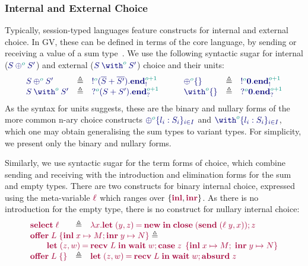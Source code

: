 \documentclass[main.tex]{subfiles}
\begin{document}
\subsubsection*{Internal and External Choice}
Typically, session-typed languages feature constructs for internal and external choice. In GV, these can be defined in terms of the core language, by sending or receiving a value of a sum type~\cite{lindleymorris15}. We use the following syntactic sugar for internal ($\ty{\tyselect[\cs{o}]{S}{S'}}$) and external ($\ty{\tyoffer[\cs{o}]{S}{S'}}$) choice and their units:
\[
\begin{array}{lcl}
  \ty{\tyselect[\cs{o}]{S}{S'}}
  & \elabarrow & \ty{\tysend[\cs{o}]{(\tysum{\co{S}}{\co{S'}})}{\tyends[\cs{o+1}]}} \\
  \ty{\tyoffer[\cs{o}]{S}{S'}}
  & \elabarrow & \ty{\tyrecv[\cs{o}]{(\tysum{S}{S'})}{\tyendr[\cs{o+1}]}} \\
\end{array}
\qquad
\begin{array}{lcl}
  \ty{\tyselectemp[\cs{o}]}
  & \elabarrow & \ty{\tysend[\cs{o}]{\tyvoid}{\tyends[\cs{o+1}]}} \\
  \ty{\tyofferemp[\cs{o}]}
  & \elabarrow & \ty{\tyrecv[\cs{o}]{\tyvoid}{\tyendr[\cs{o+1}]}} \\
\end{array}
\]
As the syntax for units suggests, these are the binary and nullary forms of the more common n-ary choice constructs $\ty{{\oplus}^{\cs{o}}\{l_i:S_i\}_{i\in{I}}}$ and $\ty{{\with}^{\cs{o}}\{l_i:S_i\}_{i\in{I}}}$, which one may obtain generalising the sum types to variant types. For simplicity, we present only the binary and nullary forms.

Similarly, we use syntactic sugar for the term forms of choice, which combine sending and receiving with the introduction and elimination forms for the sum and empty types. There are two constructs for binary internal choice, expressed using the meta-variable $\tm{\ell}$ which ranges over $\{\tm{\labinl},\tm{\labinr}\}$. As there is no introduction for the empty type, there is no construct for nullary internal choice:
\[
\begin{array}{lcl}
  \tm{\select{\ell}}
  & \elabarrow & \tm{\lambda x.\letpair{y}{z}{\new}{\andthen{\close\;(\send\;{\pair{\ell\;y}{x}})}{z}}} \\
  \multicolumn{3}{l}{\tm{\offer{L}{x}{M}{y}{N}}\elabarrow} \\
  \multicolumn{3}{l}{
  \qquad\tm{\letpair{z}{w}{\recv\;{L}}{\andthen{\wait\;{w}}{\casesum{z}{x}{M}{y}{N}}}}} \\
  \tm{\offeremp{L}}
  & \elabarrow & \tm{\letpair{z}{w}{\recv\;L}{\andthen{\wait\;{w}}{\absurd{z}}}}
\end{array}
\]
\end{document}
